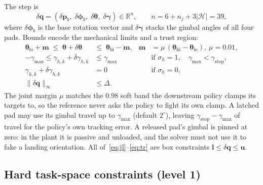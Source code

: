 \documentclass[11pt]{article}
\newcommand{\R}{\mathbb{R}}
\newcommand{\dq}{\delta\bm q}
\begin{document}
The step is
\begin{equation}
  \dq=(\delta\bm p_b,\;\delta\bm\phi_b,\;\delta\bm\theta,\;\delta\bm\gamma)\in\R^{n},
  \qquad n=6+n_j+3|\mathcal H|=39,
\end{equation}
where $\delta\bm\phi_b$ is the base rotation vector and $\delta\bm\gamma$
stacks the gimbal angles of all four pads. Bounds encode the mechanical
limits and a trust region:
\begin{align}
  \bm\theta_{\mathrm{lo}}+\bm m\;\le\;\bm\theta+\delta\bm\theta\;&\le\;\bm\theta_{\mathrm{hi}}-\bm m,
  & \bm m&=\mu\,(\bm\theta_{\mathrm{hi}}-\bm\theta_{\mathrm{lo}}),\ \mu=0.01,\label{eq:jl}\\
  -\gamma_{\max}\le\gamma_{h,k}+\delta\gamma_{h,k}&\le\gamma_{\max}
  & &\text{if }\sigma_h=1,\quad \gamma_{\max}<\gamma_{\mathrm{stop}},\label{eq:gim}\\
  \gamma_{h,k}+\delta\gamma_{h,k}&=0 & &\text{if }\sigma_h=0,\label{eq:gim0}\\
  \|\dq\|_\infty&\le\Delta. & &\label{eq:tr}
\end{align}
The joint margin $\mu$ matches the $0.98$ soft band the downstream policy
clamps its targets to, so the reference never asks the policy to fight its
own clamp. A latched pad may use its gimbal travel up to $\gamma_{\max}$
(default $2^\circ$), leaving $\gamma_{\mathrm{stop}}-\gamma_{\max}$ of travel
for the policy's own tracking error. A released pad's gimbal is pinned at
zero: in the plant it is passive and unloaded, and the solver must not use
it to fake a landing orientation. All of~\eqref{eq:jl}--\eqref{eq:tr} are
box constraints $\bm l\le\dq\le\bm u$.

\subsection{Hard task-space constraints (level 1)}
\end{document}
